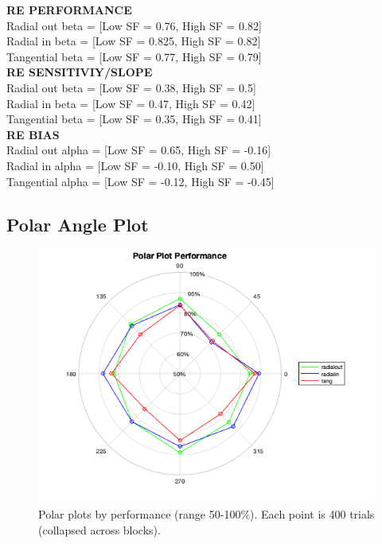 \documentclass[11pt]{article} %
\begin{document}
\textbf{RE PERFORMANCE}
\\
Radial out beta = [Low SF = 0.76, High SF = 0.82]
\\
Radial in beta = [Low SF = 0.825, High SF = 0.82]
\\
Tangential beta = [Low SF = 0.77, High SF = 0.79]
\\
\textbf{RE SENSITIVIY/SLOPE}
\\
Radial out beta = [Low SF = 0.38, High SF = 0.5]
\\
Radial in beta = [Low SF = 0.47, High SF = 0.42]
\\
Tangential beta = [Low SF = 0.35, High SF = 0.41]
\\
\textbf{RE BIAS}
\\
Radial out alpha = [Low SF = 0.65, High SF = -0.16]
\\
Radial in alpha = [Low SF = -0.10, High SF = 0.50]
\\
Tangential alpha = [Low SF = -0.12, High SF = -0.45]


\newpage
\subsection{Polar Angle Plot}
\begin{figure}[H]
\centering %
\includegraphics[scale=.5]{Images/performance_polarplot.png}
\caption{Polar plots by performance (range 50-100\%). Each point is 400 trials (collapsed across blocks).}
\end{figure}
\end{document}
